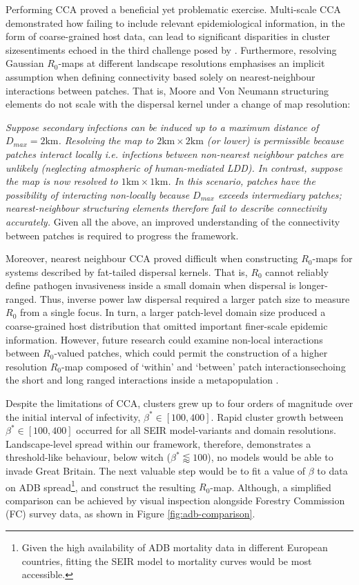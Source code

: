 Performing CCA proved a beneficial yet problematic exercise.
Multi-scale CCA demonstrated how failing to include relevant epidemiological information, in the form of coarse-grained host data, can lead to significant disparities in cluster size\textemdash sentiments echoed in the third challenge posed by \cite{13-challenges}.
Furthermore, resolving Gaussian $R_0$-maps at different landscape resolutions emphasises an implicit assumption when defining connectivity based solely on nearest-neighbour interactions between patches. 
That is, Moore and Von Neumann structuring elements do not scale with the dispersal kernel under a change of map resolution:

\textit{Suppose secondary infections can be induced up to a maximum distance of $D_{max} = 2\mathrm{km}$.
Resolving the map to $\mathrm{2km \times 2km}$ (or lower) is permissible because patches interact locally i.e. infections between non-nearest neighbour patches are unlikely (neglecting atmospheric of human-mediated LDD).
In contrast, suppose the map is now resolved to $\mathrm{1km \times 1km}$.
In this scenario, patches have the possibility of interacting non-locally because $D_{max}$ exceeds intermediary patches;
nearest-neighbour structuring elements therefore fail to describe connectivity accurately.}
Given all the above, an improved understanding of the connectivity between patches is required to progress the framework.

Moreover, nearest neighbour CCA proved difficult when constructing $R_0$-maps for systems described by fat-tailed dispersal kernels.
That is, $R_0$ cannot reliably define pathogen invasiveness inside a small domain when dispersal is longer-ranged.
Thus, inverse power law dispersal required a larger patch size to measure $R_0$ from a single focus. 
In turn, a larger patch-level domain size produced a coarse-grained host distribution that omitted important finer-scale epidemic information.
However, future research could examine non-local interactions between $R_0$-valued patches, which could permit the construction of a higher resolution $R_0$-map composed of `within' and `between' patch interactions\textemdash echoing 
the short and long ranged interactions inside a metapopulation \cite{beninca2020trade}.

Despite the limitations of CCA, clusters grew up to four orders of magnitude over the initial interval of infectivity, $\beta^*\in [100, 400]$.
Rapid cluster growth between $\beta^*\in [100, 400]$ occurred for all SEIR model-variants and domain resolutions.
Landscape-level spread within our framework, therefore, demonstrates a threshold-like behaviour, below witch ($\beta^* \lessapprox 100$), no models would be able to invade Great Britain.
The next valuable step would be to fit a value of $\beta$ to data on ADB spread\footnote{Given the high availability of ADB mortality data in different European countries, fitting the SEIR model to mortality curves would be most accessible.}, 
and construct the resulting $R_0$-map. Although, a simplified comparison can be achieved by visual inspection alongside Forestry Commission (FC) survey data, as shown in Figure \ref{fig:adb-comparison}.

